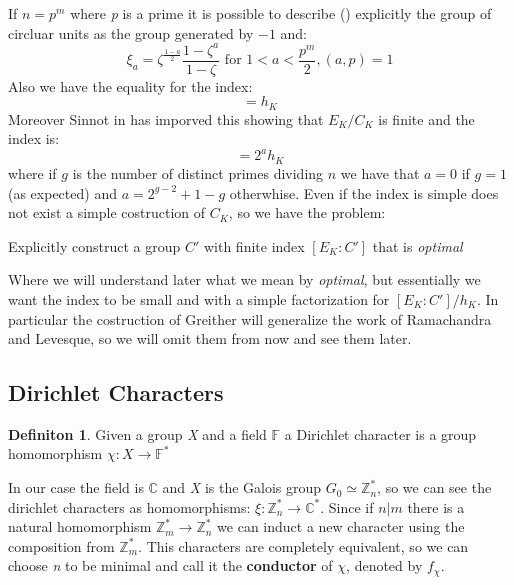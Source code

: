 \documentclass[]{article}
\theoremstyle{plain}
\theoremstyle{remark}
\theoremstyle{definition}
\newtheorem{deff}[teo]{Definiton}
\newcommand{\Z}{\mathbb{Z}}
\newcommand{\F}{\mathbb{F}}
\newcommand{\C}{\mathbb{C}}
\begin{document}
	
	If $ n=p^m $ where \textit{p} is a prime it is possible to describe (\cite[Lemma~8.1, Theorem~8.2]{CF}) explicitly the group of circluar units as the group generated by $ -1 $ and:
	\[
		\xi_a = \zeta^{ \frac{1-a}{2}} \frac{1 - \zeta ^a}{1 - \zeta } \text{ for } 1 < a < \frac{p^m}{2}, (a,p)=1
	\]
	Also we have the equality for the index:
	\begin{equation*}
		[ E_K : C_K ] = h_K
	\end{equation*}
	Moreover Sinnot in \cite{SIN} has imporved this showing that $ E_K / C_K $ is finite and the index is:
	 \begin{equation*}
		 [ E_K : C_K ] = 2^a h_K
	 \end{equation*}
	 where if $ g $ is the number of distinct primes dividing $ n $ we have that $ a=0 $ if $ g=1 $ (as expected) and $ a = 2^{g-2} + 1 - g $ otherwhise. 
	 Even if the index is simple does not exist a simple costruction of $ C_K $, so we have the problem:
	 
	 \begin{tcolorbox}
	 	Explicitly construct a group $ C' $ with finite index $ [ E_K : C' ] $ that is \textit{optimal}
	 \end{tcolorbox}
 
 	Where we will understand later what we mean by \textit{optimal}, but essentially we want the index to be small and with a simple factorization for $ [ E_K : C' ] / h_K $. In particular the costruction of Greither will generalize the work of Ramachandra and Levesque, so we will omit them from now and see them later. 
	 
	\subsection{Dirichlet Characters}
	 
	 \begin{deff}
	 	Given a group \textit{X} and a field $ \F $ a Dirichlet character is a group homomorphism $ \chi :X \to \F ^*  $
	 \end{deff}
	 
	 In our case the field is $ \C $ and \textit{X} is the Galois group $ G_0 \simeq \Z_{n}^*$, so we can see the dirichlet characters as homomorphisms: $ \xi :  \Z_{n}^* \to \C ^* $. Since if $ n | m $ there is a natural homomorphism $ \Z_m^* \to \Z_n^* $ we can induct a new character using the composition from $ \Z_m ^* $. This characters are completely equivalent, so we can choose \textit{n} to be minimal and call it the \textbf{conductor} of $\chi$, denoted by $ f_\chi $. 
	 
\end{document}
